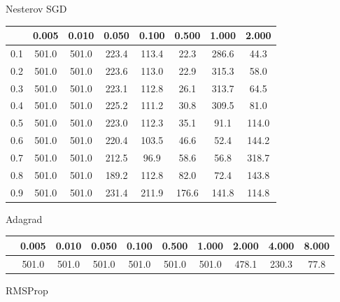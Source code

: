 \documentclass[a4paper,14pt,oneside,openany]{memoir}
\begin{document}
	Nesterov SGD 
	
	\begin{tabular}{|c|c|c|c|c|c|c|c|}
	\hline 
	 &0.005 &0.010 &0.050 &0.100 &0.500 &1.000 &2.000 \\
	 \hline 
	0.1 &501.0 &501.0 &223.4 &113.4 &22.3 &286.6 &44.3 \\
	 \hline 
	0.2 &501.0 &501.0 &223.6 &113.0 &22.9 &315.3 &58.0 \\
	 \hline 
	0.3 &501.0 &501.0 &223.1 &112.8 &26.1 &313.7 &64.5 \\
	 \hline 
	0.4 &501.0 &501.0 &225.2 &111.2 &30.8 &309.5 &81.0 \\
	 \hline 
	0.5 &501.0 &501.0 &223.0 &112.3 &35.1 &91.1 &114.0 \\
	 \hline 
	0.6 &501.0 &501.0 &220.4 &103.5 &46.6 &52.4 &144.2 \\
	 \hline 
	0.7 &501.0 &501.0 &212.5 &96.9 &58.6 &56.8 &318.7 \\
	 \hline 
	0.8 &501.0 &501.0 &189.2 &112.8 &82.0 &72.4 &143.8 \\
	 \hline 
	0.9 &501.0 &501.0 &231.4 &211.9 &176.6 &141.8 &114.8 \\
	 \hline 
	
	\end{tabular}
	
	Adagrad 
	
	\begin{tabular}{|c|c|c|c|c|c|c|c|c|c|}
	\hline 
	 &0.005 &0.010 &0.050 &0.100 &0.500 &1.000 &2.000 &4.000 &8.000 \\
	 \hline 
	 &501.0 &501.0 &501.0 &501.0 &501.0 &501.0 &478.1 &230.3 &77.8 \\
	 \hline 
	
	\end{tabular}
	
	RMSProp 
	
\end{document}
